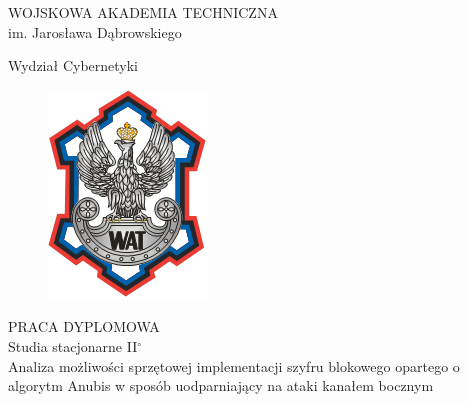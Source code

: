 
\begin{titlepage}
	\begin{center}
	\fontsize{28pt}{34pt}\selectfont
	WOJSKOWA AKADEMIA TECHNICZNA \\
	\fontsize{14pt}{20pt}\selectfont
	im. Jarosława Dąbrowskiego
	\vspace*{1.0\baselineskip}
	
	\fontsize{24pt}{20pt}\selectfont
	Wydział Cybernetyki
	
	\begin{figure}[!ht]
	    \centering
	    \includegraphics{rysunki/logo_wat.png}
	\end{figure}
	

	\fontsize{32pt}{20pt}\selectfont
	PRACA DYPLOMOWA \\
	\fontsize{20pt}{20pt}\selectfont
	Studia stacjonarne II$^\circ$\\
	\vspace*{1.15\baselineskip}
	\fontsize{15pt}{18pt}\selectfont
	Analiza możliwości sprzętowej implementacji szyfru blokowego opartego o algorytm Anubis w sposób uodparniający na ataki kanałem bocznym \\
	\end{center}

	
	
	
\end{titlepage}
